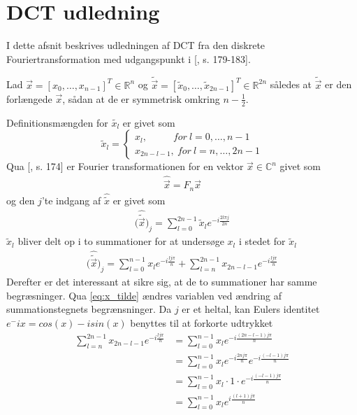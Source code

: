 \chapter{DCT udledning}
\label{DCT_udledning}
I dette afsnit beskrives udledningen af DCT fra den diskrete Fouriertransformation med udgangspunkt i [\citet{applied_mathematics}, s. 179-183].

Lad $\vec{x}=[x_0,\ldots,x_{n-1}]^T \in \mathbb{R}^n$ og $\tilde{\vec{x}}=[\tilde{x}_0,\ldots,\tilde{x}_{2n-1}]^T \in \mathbb{R}^{2n}$ således at $\tilde{\vec{x}}$ er den forlængede $\vec{x}$, sådan at de er symmetrisk omkring $n-\frac{1}{2}$.

Definitionsmængden for $\tilde{x_l}$ er givet som
\begin{equation}
\tilde{x}_l = 
\begin{cases}
			x_l, \phantom{mmm} for \ l = 0,\ldots,n - 1 \\
			x_{2n-l-1},\ for \ l = n,\ldots,2n - 1
\end{cases}
\label{eq:x_tilde}
\end{equation}
Qua [\citet{applied_mathematics}, s. 174] er Fourier transformationen for en vektor $\vec{x} \in \mathbb{C}^n$ givet som
\begin{align}
\hat{\vec{x}}=F_n\vec{x}
\end{align}
og den $j$'te indgang af $\hat{\tilde{x}}$ er givet som
\begin{align}
\Big(\hat{\tilde{\vec{x}}}\Big)_j = \sum_{l=0}^{2n - 1} \tilde{x}_l \textit{e}^{-i \frac{2l \pi j}{2n}}
\end{align}
$\tilde{x}_l$ bliver delt op i to summationer for at undersøge $x_l$ i stedet for $\tilde{x}_l$
\begin{align}
\Big(\hat{\tilde{\vec{x}}}\Big)_j = \sum_{l=0}^{n - 1} x_l \textit{e}^{-i\frac{lj\pi}{n}} + \sum_{l=n}^{2n - 1} x_{2n - l - 1} \textit{e}^{-i \frac{lj \pi}{n}}
\label{DCT Udledning 1}
\end{align}
Derefter er det interessant at sikre sig, at de to summationer har samme begræsninger. Qua \ref{eq:x_tilde} ændres variablen ved ændring af summationstegnets begrænsninger. Da $j$ er et heltal, kan Eulers identitet $e^-ix = cos(x)-i sin(x)$ benyttes til at forkorte udtrykket
\begin{align*}
\sum_{l=n}^{2n - 1} x_{2n - l - 1} \textit{e}^{-i \frac{lj \pi}{n}} & = \sum_{l=0}^{n - 1} x_l \textit{e}^{-i \frac{(2n -l -1)j \pi}{n}}\\
&= \sum_{l=0}^{n - 1} x_l\textit{e}^{-i \frac{2nj \pi}{n}} \textit{e}^{-i \frac{(-l -1)j \pi}{n}}\\
&= \sum_{l=0}^{n - 1} x_l \cdot 1 \cdot \textit{e}^{-i \frac{(-l -1)j \pi}{n}}\\
&= \sum_{l=0}^{n - 1} x_l \textit{e}^{i \frac{(l+1)j\pi}{n}} 
\end{align*}
